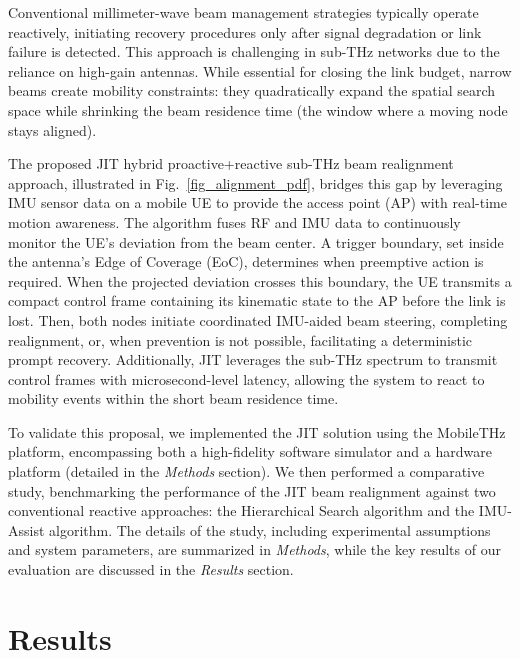 \documentclass[fleqn,10pt]{wlscirep}
\begin{document}
Conventional millimeter-wave beam management strategies typically operate reactively, initiating recovery procedures only after signal degradation or link failure is detected\cite{Giordani2018ATO, Wang2022}. This approach is challenging in sub-THz networks due to the reliance on high-gain antennas\cite{Kleine-Ostmann2011}. While essential for closing the link budget, narrow beams create mobility constraints: they quadratically expand the spatial search space while shrinking the beam residence time (the window where a moving node stays aligned).

The proposed JIT hybrid proactive+reactive sub-THz beam realignment approach, illustrated in Fig.~\ref{fig_alignment_pdf}, bridges this gap by leveraging IMU sensor data on a mobile UE to provide the access point (AP) with real-time motion awareness. The algorithm fuses RF and IMU data to continuously monitor the UE's deviation from the beam center. A trigger boundary, set inside the antenna's Edge of Coverage (EoC), determines when preemptive action is required. When the projected deviation crosses this boundary, the UE transmits a compact control frame containing its kinematic state to the AP before the link is lost. Then, both nodes initiate coordinated IMU-aided beam steering, completing realignment, or, when prevention is not possible, facilitating a deterministic prompt recovery. Additionally, JIT leverages the sub-THz spectrum to transmit control frames with microsecond-level latency, allowing the system to react to mobility events within the short beam residence time.

To validate this proposal, we implemented the JIT solution using the MobileTHz platform, encompassing both a high-fidelity software simulator and a hardware platform (detailed in the \textit{Methods} section). We then performed a comparative study, benchmarking the performance of the JIT beam realignment against two conventional reactive approaches: the Hierarchical Search algorithm and the IMU-Assist algorithm. The details of the study, including experimental assumptions and system parameters, are summarized in \textit{Methods}, while the key results of our evaluation are discussed in the \textit{Results} section.



\section*{Results}
\end{document}
